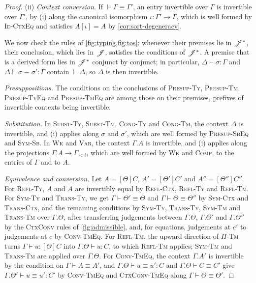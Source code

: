 \begin{proof}
    (ii) \emph{Context conversion.} If $\vdash \Gamma \equiv \Gamma'$, an entry invertible over $\Gamma$ is invertible over $\Gamma'$, by (i) along the canonical isomorphism $\iota : \Gamma' \to \Gamma$, which is well formed by \textsc{Id-CtxEq} and satisfies $A[\iota] = A$ by \cref{cor:sort-degeneracy}.

    We now check the rules of \cref{fig:typing,fig:tos}: whenever their premises lie in $\mathscr{J}^*$, their conclusion, which lies in $\mathscr{J}$, satisfies the conditions of $\mathscr{J}^*$. A premise that is a derived form lies in $\mathscr{J}^*$ conjunct by conjunct; in particular, $\Delta \vdash \sigma : \Gamma$ and $\Delta \vdash \sigma \equiv \sigma' : \Gamma$ contain $\vdash \Delta$, so $\Delta$ is then invertible.

    \emph{Presuppositions.} The conditions on the conclusions of \textsc{Presup-Ty}, \textsc{Presup-Tm}, \textsc{Presup-TyEq} and \textsc{Presup-TmEq} are among those on their premises, prefixes of invertible contexts being invertible.

    \emph{Substitution.} In \textsc{Subst-Ty}, \textsc{Subst-Tm}, \textsc{Cong-Ty} and \textsc{Cong-Tm}, the context $\Delta$ is invertible, and (i) applies along $\sigma$ and $\sigma'$, which are well formed by \textsc{Presup-SbEq} and \textsc{Sym-Sb}. In \textsc{Wk} and \textsc{Var}, the context $\Gamma.A$ is invertible, and (i) applies along the projections $\Gamma.A \to \Gamma_{<i}$, which are well formed by \textsc{Wk} and \textsc{Comp}, to the entries of $\Gamma$ and to $A$.

    \emph{Equivalence and conversion.} Let $A = [\Theta]C$, $A' = [\Theta']C'$ and $A'' = [\Theta'']C''$. For \textsc{Refl-Ty}, $A$ and $A$ are invertibly equal by \textsc{Refl-Ctx}, \textsc{Refl-Ty} and \textsc{Refl-Tm}. For \textsc{Sym-Ty} and \textsc{Trans-Ty}, we get $\Gamma \vdash \Theta' \equiv \Theta$ and $\Gamma \vdash \Theta \equiv \Theta''$ by \textsc{Sym-Ctx} and \textsc{Trans-Ctx}, and the remaining conditions by \textsc{Sym-Ty}, \textsc{Trans-Ty}, \textsc{Sym-Tm} and \textsc{Trans-Tm} over $\Gamma.\Theta$, after transferring judgements between $\Gamma.\Theta$, $\Gamma.\Theta'$ and $\Gamma.\Theta''$ by the \textsc{CtxConv} rules of \cref{fig:admissible}, and, for equations, judgements at $c'$ to judgements at $c$ by \textsc{Conv-TmEq}. For \textsc{Refl-Tm}, the upward direction of \textsc{$\Pi$-Tm} turns $\Gamma \vdash u : [\Theta]C$ into $\Gamma.\Theta \vdash u : C$, to which \textsc{Refl-Tm} applies; \textsc{Sym-Tm} and \textsc{Trans-Tm} are applied over $\Gamma.\Theta$. For \textsc{Conv-TmEq}, the context $\Gamma.A'$ is invertible by the condition on $\Gamma \vdash A \equiv A'$, and $\Gamma.\Theta \vdash u \equiv u' : C$ and $\Gamma.\Theta \vdash C \equiv C'$ give $\Gamma.\Theta' \vdash u \equiv u' : C'$ by \textsc{Conv-TmEq} and \textsc{CtxConv-TmEq} along $\Gamma \vdash \Theta \equiv \Theta'$.


\end{proof}

